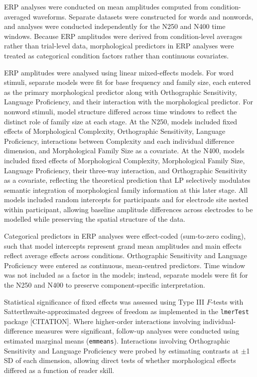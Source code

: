 \documentclass[utf8]{FrontiersinHarvard} %
\begin{document}
	ERP analyses were conducted on mean amplitudes computed from condition-averaged waveforms. Separate datasets were constructed for words and nonwords, and analyses were conducted independently for the N250 and N400 time windows. Because ERP amplitudes were derived from condition-level averages rather than trial-level data, morphological predictors in ERP analyses were treated as categorical condition factors rather than continuous covariates.
	
	ERP amplitudes were analysed using linear mixed-effects models. For word stimuli, separate models were fit for base frequency and family size, each entered as the primary morphological predictor along with Orthographic Sensitivity, Language Proficiency, and their interaction with the morphological predictor. For nonword stimuli, model structure differed across time windows to reflect the distinct role of family size at each stage. At the N250, models included fixed effects of Morphological Complexity, Orthographic Sensitivity, Language Proficiency, interactions between Complexity and each individual difference dimension, and Morphological Family Size as a covariate. At the N400, models included fixed effects of Morphological Complexity, Morphological Family Size, Language Proficiency, their three-way interaction, and Orthographic Sensitivity as a covariate, reflecting the theoretical prediction that LP selectively modulates semantic integration of morphological family information at this later stage. All models included random intercepts for participants and for electrode site nested within participant, allowing baseline amplitude differences across electrodes to be modelled while preserving the spatial structure of the data.
	
	Categorical predictors in ERP analyses were effect-coded (sum-to-zero coding), such that model intercepts represent grand mean amplitudes and main effects reflect average effects across conditions. Orthographic Sensitivity and Language Proficiency were entered as continuous, mean-centred predictors. Time window was not included as a factor in the models; instead, separate models were fit for the N250 and N400 to preserve component-specific interpretation.
	
	Statistical significance of fixed effects was assessed using Type III $F$-tests with Satterthwaite-approximated degrees of freedom as implemented in the \texttt{lmerTest} package [CITATION]. Where higher-order interactions involving individual-difference measures were significant, follow-up analyses were conducted using estimated marginal means (\texttt{emmeans}). Interactions involving Orthographic Sensitivity and Language Proficiency were probed by estimating contrasts at $\pm$1 SD of each dimension, allowing direct tests of whether morphological effects differed as a function of reader skill.
	
\end{document}
